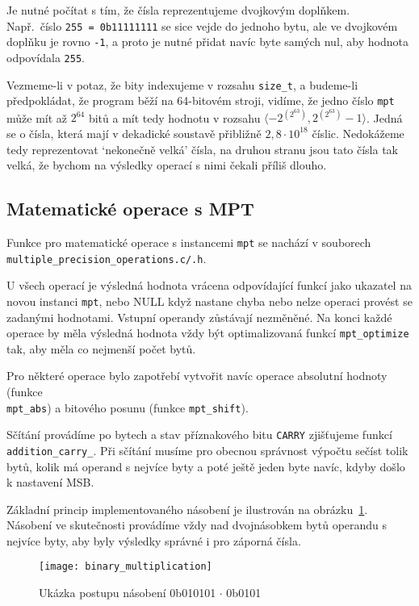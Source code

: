 Je nutné počítat s tím, že čísla reprezentujeme dvojkovým doplňkem. \\Např.~číslo \verb|255 = 0b11111111| se sice vejde do jednoho bytu, ale ve dvojkovém doplňku je rovno \verb|-1|, a proto je nutné přidat navíc byte samých nul, aby hodnota odpovídala \verb|255|.

Vezmeme-li v potaz, že bity indexujeme v rozsahu \verb|size_t|, a budeme-li předpokládat, že program běží na 64-bitovém stroji, vidíme, že jedno číslo \verb|mpt| může mít až $2^{64}$ bitů a mít tedy hodnotu v rozsahu $\langle-2^{(2^{63})}, 2^{(2^{63})}-1\rangle$. Jedná se o čísla, která mají v dekadické soustavě přibližně $2,8\cdot{}10^{18}$ číslic. Nedokážeme tedy reprezentovat `nekonečně velká' čísla, na druhou stranu jsou tato čísla tak velká, že bychom na výsledky operací s nimi čekali příliš dlouho.

\subsection{Matematické operace s MPT}\label{subsection:mpt_operace}
Funkce pro matematické operace s instancemi \verb|mpt| se nachází v souborech \\\verb|multiple_precision_operations.c/.h|.

U všech operací je výsledná hodnota vrácena odpovídající funkcí jako ukazatel na novou instanci \verb|mpt|, nebo NULL když nastane chyba nebo nelze operaci provést se zadanými hodnotami. Vstupní operandy zůstávají nezměněné. Na konci každé operace by měla výsledná hodnota vždy být optimalizovaná funkcí \verb|mpt_optimize| tak, aby měla co nejmenší počet bytů. 

Pro některé operace bylo zapotřebí vytvořit navíc operace absolutní hodnoty (funkce \\ \verb|mpt_abs|) a bitového posunu (funkce \verb|mpt_shift|).

Sčítání provádíme po bytech a stav příznakového bitu \verb|CARRY| zjišťujeme funkcí \\\verb|addition_carry_|. Při sčítání musíme pro obecnou správnost výpočtu sečíst tolik bytů, kolik má operand s nejvíce byty a poté ještě jeden byte navíc, kdyby došlo k nastavení MSB.

Základní princip implementovaného násobení je ilustrován na obrázku~\ref{fig:binary_multiplication}.
Násobení ve skutečnosti provádíme vždy nad dvojnásobkem bytů operandu s nejvíce byty, aby byly výsledky správné i pro záporná čísla.

\begin{figure}[ht]
    \centering
    \texttt{[image: binary\_multiplication]}
    \caption{Ukázka postupu násobení 0b010101 $\cdot{}$ 0b0101}\label{fig:binary_multiplication}
\end{figure}

